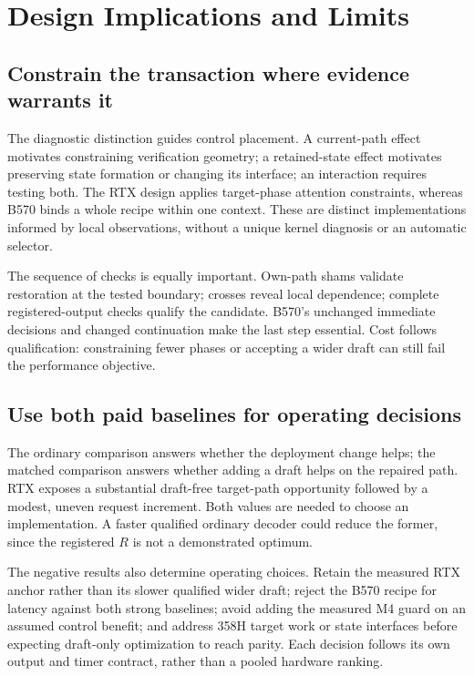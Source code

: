 \section{Design Implications and Limits}
\label{sec:implications}
\subsection{Constrain the transaction where evidence warrants it}
The diagnostic distinction guides control placement. A current-path effect motivates constraining verification geometry; a retained-state effect motivates preserving state formation or changing its interface; an interaction requires testing both. The RTX design applies target-phase attention constraints, whereas B570 binds a whole recipe within one context. These are distinct implementations informed by local observations, without a unique kernel diagnosis or an automatic selector.

The sequence of checks is equally important. Own-path shams validate restoration at the tested boundary; crosses reveal local dependence; complete registered-output checks qualify the candidate. B570's unchanged immediate decisions and changed continuation make the last step essential. Cost follows qualification: constraining fewer phases or accepting a wider draft can still fail the performance objective.

\subsection{Use both paid baselines for operating decisions}
The ordinary comparison answers whether the deployment change helps; the matched comparison answers whether adding a draft helps on the repaired path. RTX exposes a substantial draft-free target-path opportunity followed by a modest, uneven request increment. Both values are needed to choose an implementation. A faster qualified ordinary decoder could reduce the former, since the registered $R$ is not a demonstrated optimum.

The negative results also determine operating choices. Retain the measured RTX anchor rather than its slower qualified wider draft; reject the B570 recipe for latency against both strong baselines; avoid adding the measured M4 guard on an assumed control benefit; and address 358H target work or state interfaces before expecting draft-only optimization to reach parity. Each decision follows its own output and timer contract, rather than a pooled hardware ranking.


